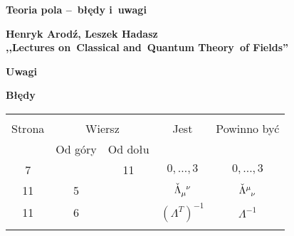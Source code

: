 \documentclass[a4paper,11pt]{article}
\newcommand{\spaceTwo}{2em}
\newcommand{\spaceThree}{1em}
\newcommand{\ld}{\ldots}
\newcommand{\fr}{\frac}
\newcommand{\mr}{\mathrm}
\newcommand{\La}{\Lambda}
\newcommand{\ten}{\tensor}
\newcommand{\de}{\mr{d}}
\newcommand{\dd}[3]{\fr{ \de^{ #1 } { #2 } }{ \de { #3 }^{ #1 } }}
\newcommand{\tb}{\textbf}
\newcommand{\Center}[1]{\begin{center} #1 \end{center}}
\newcommand{\CenterTB}[1]{\Center{\tb{#1}}}
\newcommand{\Field}[1]{ \begin{center} {\Large \tb{#1} } \end{center} }
\newcommand{\Work}[1]{ \begin{center} {\large \tb{#1}} \end{center} }
\begin{document}





\newpage
\Field{Teoria pola --~błędy i~uwagi}

\vspace{\spaceTwo} %



\Work{
  Henryk Arodź, Leszek Hadasz \\
  ,,Lectures on~Classical and~Quantum Theory~of Fields''
  \cite{ArodzHadaszFieldTheory10} }


\CenterTB{Uwagi}

\CenterTB{Błędy}
\begin{center}
  \begin{tabular}{|c|c|c|c|c|}
    \hline
    & \multicolumn{2}{c|}{} & & \\
    Strona & \multicolumn{2}{c|}{Wiersz} & Jest & Powinno być \\ \cline{2-3}
    & Od góry & Od dołu &  &  \\ \hline
    7 & & 11 & $0,\ld,\!3$ & $0,\ld, 3$ \\
    11 & 5 & & $\ten{ \check{ \La } }{ _{ \mu }^{ \nu } }$
           & $\ten{ \check{ \La } }{ ^{ \mu }_{ \nu } }$ \\
    11 & 6 & & $( \La^{ T } )^{ -1 }$ & $\La^{ -1 }$ \\
    & & & & \\ \hline
  \end{tabular}
\end{center}
\end{document}
